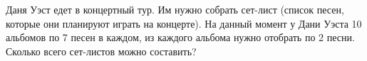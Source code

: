 \question
Даня Уэст едет в концертный тур. Им нужно собрать сет-лист (список песен, которые они планируют играть на концерте). На данный момент у Дани Уэста 10 альбомов по 7 песен в каждом, из каждого альбома нужно отобрать по 2 песни. Сколько всего сет-листов можно составить?

